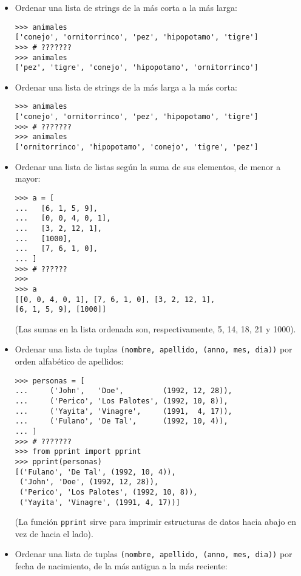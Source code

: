 \begin{itemize}
\item
  Ordenar una lista de strings de la más corta a la más larga:

\begin{lstlisting}
>>> animales
['conejo', 'ornitorrinco', 'pez', 'hipopotamo', 'tigre']
>>> # ???????
>>> animales
['pez', 'tigre', 'conejo', 'hipopotamo', 'ornitorrinco']
\end{lstlisting}
\item
  Ordenar una lista de strings de la más larga a la más corta:

\begin{lstlisting}
>>> animales
['conejo', 'ornitorrinco', 'pez', 'hipopotamo', 'tigre']
>>> # ???????
>>> animales
['ornitorrinco', 'hipopotamo', 'conejo', 'tigre', 'pez']
\end{lstlisting}
\item
  Ordenar una lista de listas según la suma de sus elementos, de menor a
  mayor:

\begin{lstlisting}
>>> a = [
...   [6, 1, 5, 9],
...   [0, 0, 4, 0, 1],
...   [3, 2, 12, 1],
...   [1000],
...   [7, 6, 1, 0],
... ]
>>> # ??????
>>>
>>> a
[[0, 0, 4, 0, 1], [7, 6, 1, 0], [3, 2, 12, 1],
[6, 1, 5, 9], [1000]]
\end{lstlisting}

  (Las sumas en la lista ordenada son, respectivamente, 5, 14, 18, 21 y
  1000).
\item
  Ordenar una lista de tuplas
  \lstinline!(nombre, apellido, (anno, mes, dia))! por orden alfabético
  de apellidos:

\begin{lstlisting}
>>> personas = [
...     ('John',   'Doe',         (1992, 12, 28)),
...     ('Perico', 'Los Palotes', (1992, 10, 8)),
...     ('Yayita', 'Vinagre',     (1991,  4, 17)),
...     ('Fulano', 'De Tal',      (1992, 10, 4)),
... ]
>>> # ???????
>>> from pprint import pprint
>>> pprint(personas)
[('Fulano', 'De Tal', (1992, 10, 4)),
 ('John', 'Doe', (1992, 12, 28)),
 ('Perico', 'Los Palotes', (1992, 10, 8)),
 ('Yayita', 'Vinagre', (1991, 4, 17))]
\end{lstlisting}

  (La función \lstinline!pprint! sirve para imprimir estructuras de
  datos hacia abajo en vez de hacia el lado).
\item
  Ordenar una lista de tuplas
  \lstinline!(nombre, apellido, (anno, mes, dia))! por fecha de
  nacimiento, de la más antigua a la más reciente:


\end{itemize}
